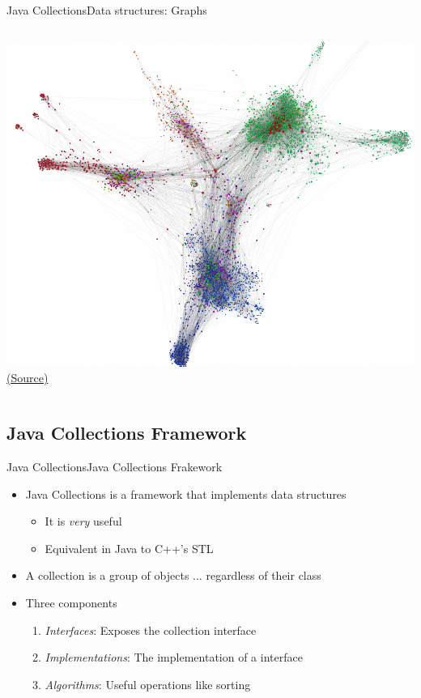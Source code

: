 \documentclass[10pt,compress]{beamer} %
\begin{document}
\begin{frame}{Java Collections}{Data structures: Graphs}
\begin{columns}
		\includegraphics[width=\linewidth]{figs/layout2.png}\\
		\centering \tiny \href{https://gephi.org/features/}{(Source)}

		\end{columns}
\end{frame}


\subsection{Java Collections Framework}
\begin{frame}{Java Collections}{Java Collections Frakework}
	\begin{itemize}
		\item Java Collections is a framework that implements data structures
			\begin{itemize}
			\item It is \textit{very} useful
			\item Equivalent in Java to C++'s STL
			\end{itemize}
		\item A collection is a group of objects ... regardless of their class
		\item Three components
			\begin{enumerate}
			\item \textit{Interfaces}: Exposes the collection interface
			\item \textit{Implementations}: The implementation of a interface
			\item \textit{Algorithms}: Useful operations like sorting
			\end{enumerate}
	\end{itemize}
\end{frame}
\end{document}
